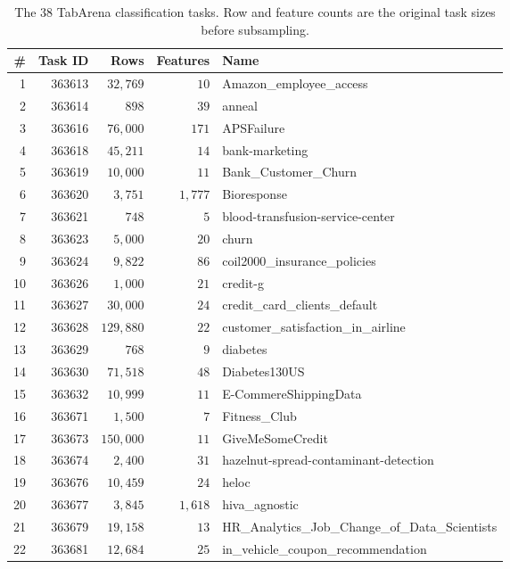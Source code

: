 \documentclass{article}
\theoremstyle{plain}
\theoremstyle{definition}
\theoremstyle{remark}
\begin{document}
\begin{table}[h]
\centering
\small
\caption{The 38 TabArena classification tasks. Row and feature counts are the original task sizes before subsampling.}
\label{tab:tabarena-tasks}
\begin{tabular}{rrrrl}
  \toprule
  \# & Task ID & Rows & Features & Name \\
  \midrule
  1  & 363613 & $32{,}769$  & $10$      & Amazon\_employee\_access \\
  2  & 363614 & $898$       & $39$      & anneal \\
  3  & 363616 & $76{,}000$  & $171$     & APSFailure \\
  4  & 363618 & $45{,}211$  & $14$      & bank-marketing \\
  5  & 363619 & $10{,}000$  & $11$      & Bank\_Customer\_Churn \\
  6  & 363620 & $3{,}751$   & $1{,}777$ & Bioresponse \\
  7  & 363621 & $748$       & $5$       & blood-transfusion-service-center \\
  8  & 363623 & $5{,}000$   & $20$      & churn \\
  9  & 363624 & $9{,}822$   & $86$      & coil2000\_insurance\_policies \\
  10 & 363626 & $1{,}000$   & $21$      & credit-g \\
  11 & 363627 & $30{,}000$  & $24$      & credit\_card\_clients\_default \\
  12 & 363628 & $129{,}880$ & $22$      & customer\_satisfaction\_in\_airline \\
  13 & 363629 & $768$       & $9$       & diabetes \\
  14 & 363630 & $71{,}518$  & $48$      & Diabetes130US \\
  15 & 363632 & $10{,}999$  & $11$      & E-CommereShippingData \\
  16 & 363671 & $1{,}500$   & $7$       & Fitness\_Club \\
  17 & 363673 & $150{,}000$ & $11$      & GiveMeSomeCredit \\
  18 & 363674 & $2{,}400$   & $31$      & hazelnut-spread-contaminant-detection \\
  19 & 363676 & $10{,}459$  & $24$      & heloc \\
  20 & 363677 & $3{,}845$   & $1{,}618$ & hiva\_agnostic \\
  21 & 363679 & $19{,}158$  & $13$      & HR\_Analytics\_Job\_Change\_of\_Data\_Scientists \\
  22 & 363681 & $12{,}684$  & $25$      & in\_vehicle\_coupon\_recommendation \\

\end{tabular}
\end{table}
\end{document}
